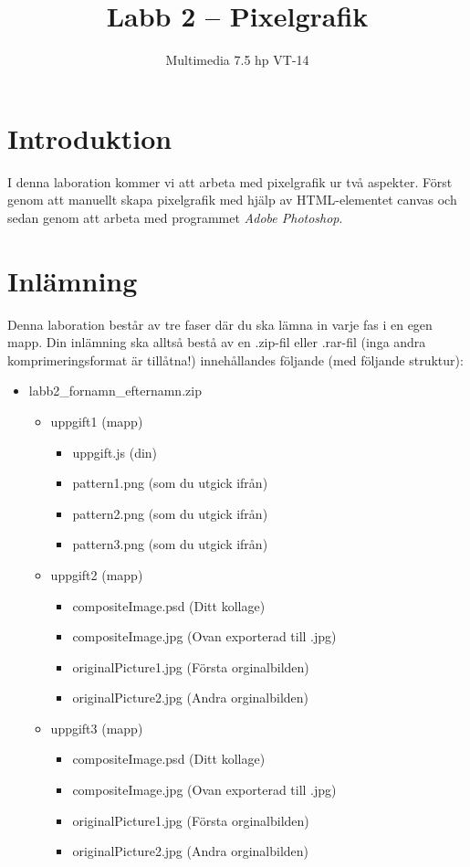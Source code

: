 \documentclass[12pt]{article}
\date{}
\title{ Labb 2 -- Pixelgrafik }
\author{ Multimedia 7.5 hp VT-14 }
\begin{document}
\maketitle
\vspace{-2em}



\section{Introduktion}
I denna laboration kommer vi att arbeta med pixelgrafik ur två aspekter. Först genom att manuellt skapa pixelgrafik med hjälp av HTML-elementet canvas och sedan genom att arbeta med programmet \emph{Adobe Photoshop}.

\section{Inlämning}
Denna laboration består av tre faser där du ska lämna in varje fas i en egen mapp. Din inlämning ska alltså bestå av en .zip-fil eller .rar-fil (inga andra komprimeringsformat är tillåtna!) innehållandes följande (med följande struktur):
  \begin{itemize}
    \item labb2\_fornamn\_efternamn.zip

      \begin{itemize}
        \item uppgift1 (mapp)
          \begin{itemize}
            \item uppgift.js (din)
            \item pattern1.png (som du utgick ifrån)
            \item pattern2.png (som du utgick ifrån)
            \item pattern3.png (som du utgick ifrån)
          \end{itemize}

        \item uppgift2 (mapp)
          \begin{itemize}
	    \item compositeImage.psd (Ditt kollage)
            \item compositeImage.jpg (Ovan exporterad till .jpg)
            \item originalPicture1.jpg (Första orginalbilden)
            \item originalPicture2.jpg (Andra orginalbilden)
          \end{itemize}
	\item uppgift3 (mapp)
          \begin{itemize}
	    \item compositeImage.psd (Ditt kollage)
            \item compositeImage.jpg (Ovan exporterad till .jpg)
            \item originalPicture1.jpg (Första orginalbilden)
            \item originalPicture2.jpg (Andra orginalbilden)
          \end{itemize}
    \end{itemize}
  \end{itemize}
\end{document}
